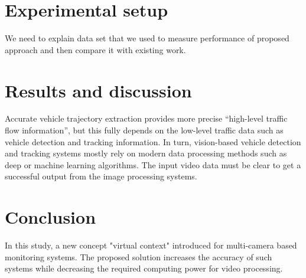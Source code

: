 \documentclass[5p,twocolumn,english]{elsarticle}
\begin{document}
%
%
%


\section{Experimental setup}

We need to explain data set that we used to measure performance of proposed approach and then compare it with existing work.


\section{Results and discussion}
\label{sec_results}

Accurate vehicle trajectory extraction provides more precise ``high-level traffic flow information'', but this fully depends on the low-level traffic data such as vehicle detection and tracking information.  In turn, vision-based vehicle detection and tracking systems mostly rely on modern data processing methods such as deep or machine learning algorithms. The input video data must be clear to get a successful output from the image processing systems. 


\section{Conclusion}

In this study, a new concept "virtual context" introduced for multi-camera based monitoring systems. The proposed solution increases the accuracy of such systems while decreasing the  required computing power for video processing.




\end{document}
